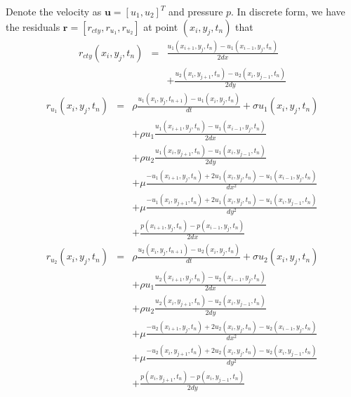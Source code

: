 \documentclass[12pt]{article} %
\newcommand{\bu}{\bm{u}}
\newcommand{\br}{\bm{r}}
\begin{document}
Denote the velocity as $\bu = [u_1, u_2]^T$ and pressure $p$.
In discrete form, we have the residuals $\br = [r_{cty}, r_{u_1}, r_{u_2}]$ at point $(x_i,y_j,t_n)$ that
\begin{eqnarray}\label{res_cty}
    r_{cty}(x_i,y_j,t_n) &=& \frac{u_1(x_{i+1},y_{j},t_{n})-u_1(x_{i-1},y_{j},t_{n})}{2dx}\nonumber\\
                         & &+ \frac{u_2(x_{i},y_{j+1},t_{n})-u_2(x_{i},y_{j-1},t_{n})}{2dy}
\end{eqnarray}
\begin{eqnarray}\label{res_u1}
    r_{u_1}(x_i,y_j,t_n) &=& \rho\frac{u_1(x_i,y_j,t_{n+1}) - u_1(x_i,y_j,t_{n})}{dt} + \sigma u_1(x_i,y_j,t_{n})\nonumber\\
                         & & + \rho u_1\frac{u_1(x_{i+1},y_{j},t_{n})-u_1(x_{i-1},y_{j},t_{n})}{2dx}\nonumber\\
                         & & + \rho u_2\frac{u_1(x_{i},y_{j+1},t_{n})-u_1(x_{i},y_{j-1},t_{n})}{2dy}\nonumber\\
                         & & + \mu \frac{-u_1(x_{i+1},y_{j},t_{n})+2u_1(x_{i},y_{j},t_{n})-u_1(x_{i-1},y_{j},t_{n})}{dx^2}\nonumber\\
                         & & + \mu \frac{-u_1(x_{i},y_{j+1},t_{n})+2u_1(x_{i},y_{j},t_{n})-u_1(x_{i},y_{j-1},t_{n})}{dy^2}\nonumber\\
                         & & + \frac{p(x_{i+1},y_{j},t_{n}) - p(x_{i-1},y_{j},t_{n})}{2dx}
\end{eqnarray}
\begin{eqnarray}\label{res_u2}
    r_{u_2}(x_i,y_j,t_n) &=& \rho\frac{u_2(x_i,y_j,t_{n+1}) - u_2(x_i,y_j,t_{n})}{dt} + \sigma u_2(x_i,y_j,t_{n})\nonumber\\
                         & & + \rho u_1\frac{u_2(x_{i+1},y_{j},t_{n})-u_2(x_{i-1},y_{j},t_{n})}{2dx}\nonumber\\
                         & & + \rho u_2\frac{u_2(x_{i},y_{j+1},t_{n})-u_2(x_{i},y_{j-1},t_{n})}{2dy}\nonumber\\
                         & & + \mu \frac{-u_2(x_{i+1},y_{j},t_{n})+2u_2(x_{i},y_{j},t_{n})-u_2(x_{i-1},y_{j},t_{n})}{dx^2}\nonumber\\
                         & & + \mu \frac{-u_2(x_{i},y_{j+1},t_{n})+2u_2(x_{i},y_{j},t_{n})-u_2(x_{i},y_{j-1},t_{n})}{dy^2}\nonumber\\
                         & & + \frac{p(x_{i},y_{j+1},t_{n}) - p(x_{i},y_{j-1},t_{n})}{2dy}
\end{eqnarray}
\end{document}
